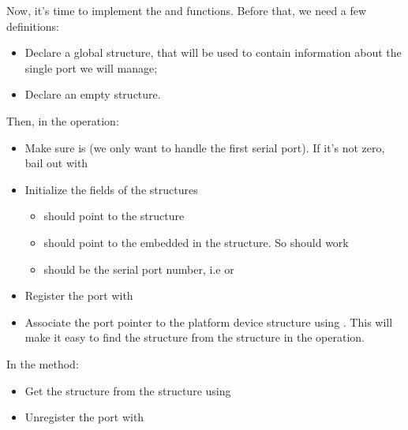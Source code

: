 Now, it's time to implement the  and 
functions. Before that, we need a few definitions:

\begin{itemize}
\item Declare a global  structure, that will be used
  to contain information about the single port we will manage;
\item Declare an empty  structure.
\end{itemize}

Then, in the  operation:

\begin{itemize}

\item Make sure  is  (we only want to handle the first
  serial port). If it's not zero, bail out with 

\item Initialize the fields of the  structures

  \begin{itemize}

  \item {} should point to the  structure

  \item {} should point to the  embedded
    in the  structure. So 
    should work

  \item {} should be the serial port number, i.e  or

  \end{itemize}

\item Register the port with 

\item Associate the port pointer to the platform device structure
  using . This will make it easy to find
  the  structure from the  structure in the
   operation.

\end{itemize}

In the  method:

\begin{itemize}

\item Get the  structure from the  structure using

\item Unregister the port with 

\end{itemize}

